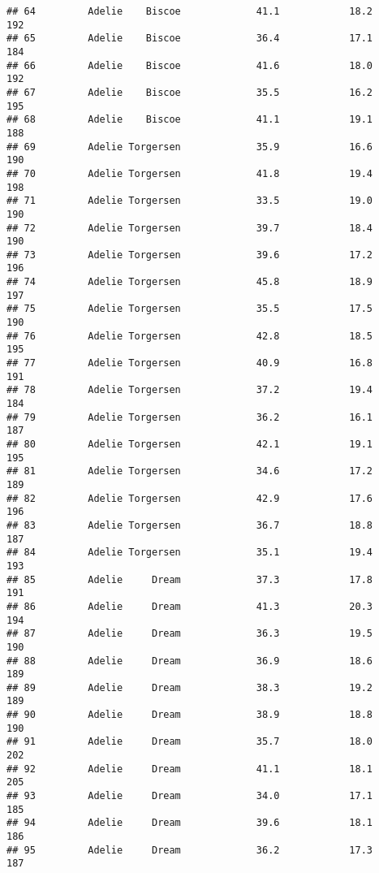 \documentclass[
]{article}
\begin{document}
\begin{verbatim}
## 64         Adelie    Biscoe             41.1            18.2               192
## 65         Adelie    Biscoe             36.4            17.1               184
## 66         Adelie    Biscoe             41.6            18.0               192
## 67         Adelie    Biscoe             35.5            16.2               195
## 68         Adelie    Biscoe             41.1            19.1               188
## 69         Adelie Torgersen             35.9            16.6               190
## 70         Adelie Torgersen             41.8            19.4               198
## 71         Adelie Torgersen             33.5            19.0               190
## 72         Adelie Torgersen             39.7            18.4               190
## 73         Adelie Torgersen             39.6            17.2               196
## 74         Adelie Torgersen             45.8            18.9               197
## 75         Adelie Torgersen             35.5            17.5               190
## 76         Adelie Torgersen             42.8            18.5               195
## 77         Adelie Torgersen             40.9            16.8               191
## 78         Adelie Torgersen             37.2            19.4               184
## 79         Adelie Torgersen             36.2            16.1               187
## 80         Adelie Torgersen             42.1            19.1               195
## 81         Adelie Torgersen             34.6            17.2               189
## 82         Adelie Torgersen             42.9            17.6               196
## 83         Adelie Torgersen             36.7            18.8               187
## 84         Adelie Torgersen             35.1            19.4               193
## 85         Adelie     Dream             37.3            17.8               191
## 86         Adelie     Dream             41.3            20.3               194
## 87         Adelie     Dream             36.3            19.5               190
## 88         Adelie     Dream             36.9            18.6               189
## 89         Adelie     Dream             38.3            19.2               189
## 90         Adelie     Dream             38.9            18.8               190
## 91         Adelie     Dream             35.7            18.0               202
## 92         Adelie     Dream             41.1            18.1               205
## 93         Adelie     Dream             34.0            17.1               185
## 94         Adelie     Dream             39.6            18.1               186
## 95         Adelie     Dream             36.2            17.3               187

\end{verbatim}
\end{document}
